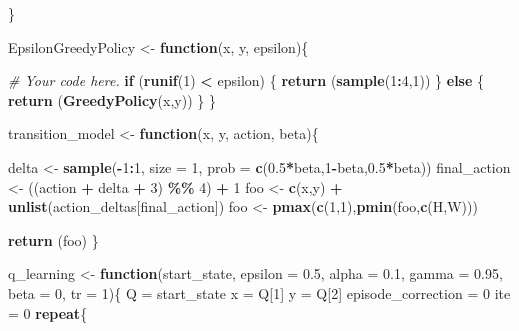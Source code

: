 \documentclass[
]{article}
\newenvironment{Shaded}{\begin{snugshade}}{\end{snugshade}}
\newcommand{\AttributeTok}[1]{\textcolor[rgb]{0.13,0.29,0.53}{#1}}
\newcommand{\CommentTok}[1]{\textcolor[rgb]{0.56,0.35,0.01}{\textit{#1}}}
\newcommand{\ControlFlowTok}[1]{\textcolor[rgb]{0.13,0.29,0.53}{\textbf{#1}}}
\newcommand{\DecValTok}[1]{\textcolor[rgb]{0.00,0.00,0.81}{#1}}
\newcommand{\FloatTok}[1]{\textcolor[rgb]{0.00,0.00,0.81}{#1}}
\newcommand{\FunctionTok}[1]{\textcolor[rgb]{0.13,0.29,0.53}{\textbf{#1}}}
\newcommand{\NormalTok}[1]{#1}
\newcommand{\OtherTok}[1]{\textcolor[rgb]{0.56,0.35,0.01}{#1}}
\newcommand{\SpecialCharTok}[1]{\textcolor[rgb]{0.81,0.36,0.00}{\textbf{#1}}}
\begin{document}
\begin{Shaded}
\begin{Highlighting}[]
\NormalTok{\}}

\NormalTok{EpsilonGreedyPolicy }\OtherTok{\textless{}{-}} \ControlFlowTok{function}\NormalTok{(x, y, epsilon)\{}

  \CommentTok{\# Your code here.}
  \ControlFlowTok{if}\NormalTok{ (}\FunctionTok{runif}\NormalTok{(}\DecValTok{1}\NormalTok{) }\SpecialCharTok{\textless{}}\NormalTok{ epsilon) \{}
    \FunctionTok{return}\NormalTok{ (}\FunctionTok{sample}\NormalTok{(}\DecValTok{1}\SpecialCharTok{:}\DecValTok{4}\NormalTok{,}\DecValTok{1}\NormalTok{))}
\NormalTok{  \} }\ControlFlowTok{else}\NormalTok{ \{}
    \FunctionTok{return}\NormalTok{ (}\FunctionTok{GreedyPolicy}\NormalTok{(x,y))}
\NormalTok{  \}}
\NormalTok{\}}

\NormalTok{transition\_model }\OtherTok{\textless{}{-}} \ControlFlowTok{function}\NormalTok{(x, y, action, beta)\{}

\NormalTok{  delta }\OtherTok{\textless{}{-}} \FunctionTok{sample}\NormalTok{(}\SpecialCharTok{{-}}\DecValTok{1}\SpecialCharTok{:}\DecValTok{1}\NormalTok{, }\AttributeTok{size =} \DecValTok{1}\NormalTok{, }\AttributeTok{prob =} \FunctionTok{c}\NormalTok{(}\FloatTok{0.5}\SpecialCharTok{*}\NormalTok{beta,}\DecValTok{1}\SpecialCharTok{{-}}\NormalTok{beta,}\FloatTok{0.5}\SpecialCharTok{*}\NormalTok{beta))}
\NormalTok{  final\_action }\OtherTok{\textless{}{-}}\NormalTok{ ((action }\SpecialCharTok{+}\NormalTok{ delta }\SpecialCharTok{+} \DecValTok{3}\NormalTok{) }\SpecialCharTok{\%\%} \DecValTok{4}\NormalTok{) }\SpecialCharTok{+} \DecValTok{1}
\NormalTok{  foo }\OtherTok{\textless{}{-}} \FunctionTok{c}\NormalTok{(x,y) }\SpecialCharTok{+} \FunctionTok{unlist}\NormalTok{(action\_deltas[final\_action])}
\NormalTok{  foo }\OtherTok{\textless{}{-}} \FunctionTok{pmax}\NormalTok{(}\FunctionTok{c}\NormalTok{(}\DecValTok{1}\NormalTok{,}\DecValTok{1}\NormalTok{),}\FunctionTok{pmin}\NormalTok{(foo,}\FunctionTok{c}\NormalTok{(H,W)))}
  
  \FunctionTok{return}\NormalTok{ (foo)}
\NormalTok{\}}

\NormalTok{q\_learning }\OtherTok{\textless{}{-}} \ControlFlowTok{function}\NormalTok{(start\_state, }\AttributeTok{epsilon =} \FloatTok{0.5}\NormalTok{, }\AttributeTok{alpha =} \FloatTok{0.1}\NormalTok{, }\AttributeTok{gamma =} \FloatTok{0.95}\NormalTok{, }
                       \AttributeTok{beta =} \DecValTok{0}\NormalTok{, }\AttributeTok{tr =} \DecValTok{1}\NormalTok{)\{}
\NormalTok{  Q }\OtherTok{=}\NormalTok{ start\_state}
\NormalTok{  x }\OtherTok{=}\NormalTok{ Q[}\DecValTok{1}\NormalTok{]}
\NormalTok{  y }\OtherTok{=}\NormalTok{ Q[}\DecValTok{2}\NormalTok{]}
\NormalTok{  episode\_correction }\OtherTok{=} \DecValTok{0}
\NormalTok{  ite }\OtherTok{=} \DecValTok{0}
  \ControlFlowTok{repeat}\NormalTok{\{}
    

\end{Highlighting}
\end{Shaded}
\end{document}
